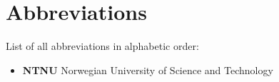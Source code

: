 \chapter{Abbreviations}

List of all abbreviations in alphabetic order:

\begin{itemize}
    \item \textbf{NTNU} Norwegian University of Science and Technology
\end{itemize}